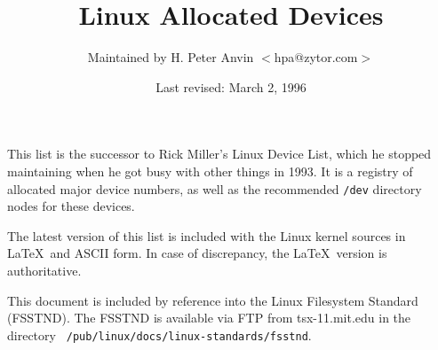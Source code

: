 %
%
\oddsidemargin=0in
\textwidth=6.5in
\topmargin=0in
\headheight=0.5in
\headsep=0.25in
\textheight=7.5in
\footskip=0.75in
\footheight=0.5in
%

\newcommand{\file}{\tt}			%
\newcommand{\hex}{\tt}			%
\newcommand{\ud}{(Under development)}	%
\newcommand{\1}{\({}^1\)}
\newcommand{\2}{\({}^2\)}
\newcommand{\3}{\({}^3\)}
\newcommand{\4}{\({}^4\)}
\newlength{\dig}
\settowidth{\dig}{0}			%
\newcommand{\num}[2]{\makebox[#1\dig][r]{#2}}
\newcommand{\major}[4]{\num{3}{#1}#2 \> #3 \> #4 \\}
\newcommand{\minor}[3]{\> \> \num{3}{#1} \> {\file #2} \> #3 \\}
\newcommand{\minordots}{\> \> \> \dots \\}
\newenvironment{devicelist}%
 {\begin{tabbing}%
000--000 \= blockxxx \= 000 \= {\file /dev/crambamboli} \= foo \kill}%
 {\end{tabbing}}
\newcommand{\link}[4]{{\file #1} \> {\file #2} \> #3 \> #4 \\}
\newcommand{\vlink}[4]{{\file #1} \> {\em #2 \/} \> #3 \> #4 \\}
\newcommand{\node}[3]{{\file #1} \> #2 \> #3 \\}
\newenvironment{nodelist}%
 {\begin{tabbing}%
{\file /dev/crambamboli} \= {\file /proc/self/fd/99} \= symbolicxxx \=
foo \kill}%
 {\end{tabbing}}
%
\title{{\bf Linux Allocated Devices}}
\author{Maintained by H. Peter Anvin $<$hpa@zytor.com$>$}
\date{Last revised: March 2, 1996}
\maketitle
%
\noindent
This list is the successor to Rick Miller's Linux Device List, which
he stopped maintaining when he got busy with other things in 1993.  It
is a registry of allocated major device numbers, as well as the
recommended {\file /dev} directory nodes for these devices.

The latest version of this list is included with the Linux kernel
sources in \LaTeX\ and ASCII form.  In case of discrepancy, the
\LaTeX\ version is authoritative.

This document is included by reference into the Linux Filesystem
Standard (FSSTND).  The FSSTND is available via FTP from
tsx-11.mit.edu in the directory {\file
/pub/linux/docs/linux-standards/fsstnd}.

